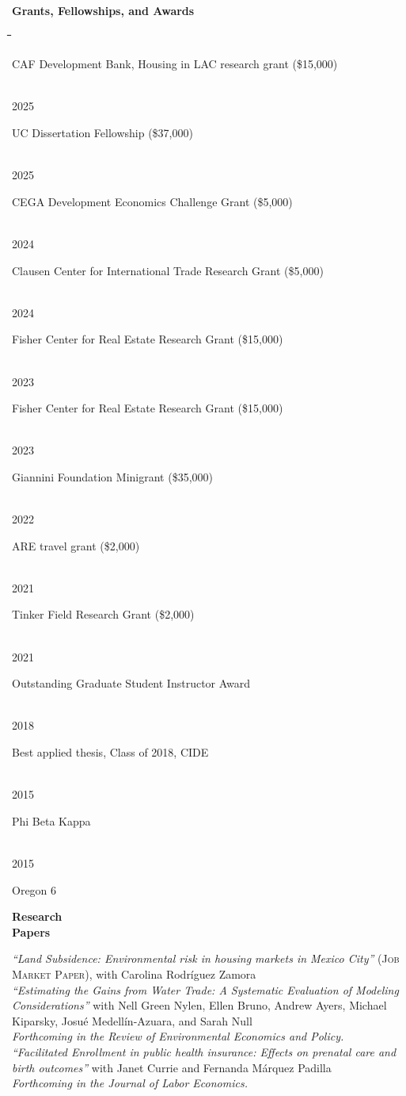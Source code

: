 \documentclass[10pt, oneside]{article}
\makeatletter
\newlength\tdima
\newcommand\tabfill[1]{%
      \setlength\tdima{\linewidth}%
      \addtolength\tdima{\@totalleftmargin}%
      \addtolength\tdima{-\dimen\@curtab}%
      \parbox[t]{\tdima}{#1\ifhmode\strut\fi}}
\newcommand\mytabs{\hspace*{1cm}\=\hspace{1cm}\=\hspace{1cm}\=\hspace{1cm}\=\hspace{1cm}\=\hspace{1cm}\=\hspace{1cm}\=\hspace{1cm}\=\hspace{1cm}\=\hspace{1cm}}
\newenvironment{mysec}[1][\mytabs]
  {\begin{tabbing}#1\kill\ignorespaces}
  {\end{tabbing}}
\makeatother
\begin{document}
\begin{minipage}[t]{0.1\linewidth}
\textbf{Grants, Fellowships, and Awards}
\end{minipage}\hspace{0.05\linewidth}
\begin{minipage}[t]{0.8\linewidth}
\begin{mysec} 
    2026 \>\>\tabfill{CAF Development Bank, Housing in LAC research grant (\$15,000)}\\ 
	2025 \>\>\tabfill{UC Dissertation Fellowship (\$37,000)} \\
    2025 \>\>\tabfill{CEGA Development Economics Challenge Grant (\$5,000)} \\
    2024 \>\>\tabfill{Clausen Center for International Trade Research Grant (\$5,000)} \\
    2024 \>\>\tabfill{Fisher Center for Real Estate Research Grant  (\$15,000)} \\
	2023 \>\>\tabfill{Fisher Center for Real Estate Research Grant  (\$15,000)} \\
    2023 \>\>\tabfill{Giannini Foundation Minigrant  (\$35,000)} \\
    2022 \>\>\tabfill{ARE travel grant  (\$2,000)} \\
    2021 \>\>\tabfill{Tinker Field Research Grant (\$2,000)}\\ 
    2021 \>\>\tabfill{Outstanding Graduate Student Instructor Award}\\ 
    2018 \>\>\tabfill{Best applied thesis, Class of 2018, CIDE}\\ 
    2015 \>\>\tabfill{Phi Beta Kappa}\\ 
    2015 \>\>\tabfill{Oregon 6}
\end{mysec} 
\end{minipage}\vspace{5mm}

\begin{minipage}[t]{0.1\linewidth}
\textbf{Research \\ Papers}
\end{minipage}\hspace{0.05\linewidth}
\begin{minipage}[t]{0.8\linewidth}
\textit{``Land Subsidence: Environmental risk in housing markets in Mexico City''} (\textsc{Job Market Paper}), with Carolina Rodríguez Zamora \\ 

\textit{``Estimating the Gains from Water Trade: A Systematic
Evaluation of Modeling Considerations''} with Nell Green Nylen, Ellen Bruno, Andrew Ayers, Michael Kiparsky, Josué Medellín-Azuara, and Sarah Null \\ 
\emph{Forthcoming in the Review of Environmental Economics and Policy.} \\

\textit{``Facilitated Enrollment in public health insurance: Effects on prenatal care and birth outcomes''} with Janet Currie and Fernanda Márquez Padilla \\ 
\emph{Forthcoming in the Journal of Labor Economics.} \\
\end{minipage}\vspace{5mm}
\end{document}
